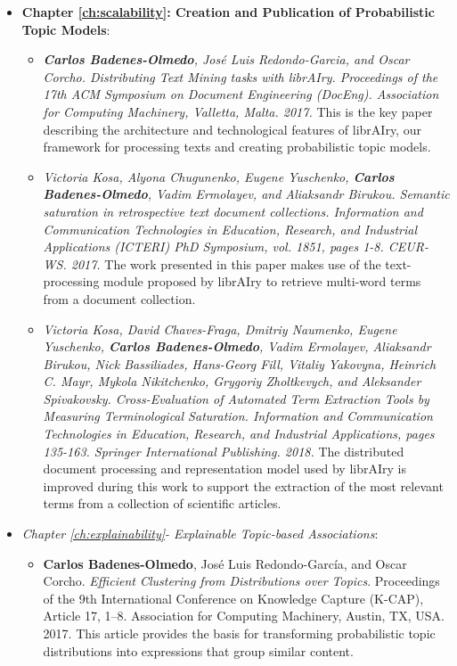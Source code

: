 \begin{itemize}
\item \textbf{Chapter \ref{ch:scalability}: Creation and Publication of Probabilistic Topic Models}:
\begin{itemize}
\item \textit{\textbf{Carlos Badenes-Olmedo}, José Luis Redondo-Garcia, and Oscar Corcho. \textit{Distributing Text Mining tasks with librAIry}. Proceedings of the 17th ACM Symposium on Document Engineering (DocEng). Association for Computing Machinery, Valletta, Malta. 2017.} This is the key paper describing the architecture and technological features of librAIry, our framework for processing texts and creating probabilistic topic models. 
\item \textit{Victoria Kosa, Alyona Chugunenko, Eugene Yuschenko, \textbf{Carlos Badenes-Olmedo}, Vadim Ermolayev, and Aliaksandr Birukou. \textit{Semantic saturation in retrospective text document collections}. Information and Communication Technologies in Education, Research, and Industrial Applications (ICTERI) PhD Symposium, vol. 1851, pages 1-8. CEUR-WS. 2017.} The work presented in this paper makes use of the text-processing module proposed by librAIry to retrieve multi-word terms from a document collection.
\item \textit{Victoria Kosa, David Chaves-Fraga, Dmitriy Naumenko, Eugene Yuschenko, \textbf{Carlos Badenes-Olmedo}, Vadim Ermolayev, Aliaksandr Birukou, Nick Bassiliades, Hans-Georg Fill, Vitaliy Yakovyna, Heinrich C. Mayr, Mykola Nikitchenko, Grygoriy Zholtkevych, and Aleksander Spivakovsky. \textit{Cross-Evaluation of Automated Term Extraction Tools by Measuring Terminological Saturation}. Information and Communication Technologies in Education, Research, and Industrial Applications, pages 135-163. Springer International Publishing. 2018.} The distributed document processing and representation model used by librAIry is improved during this work to support the extraction of the most relevant terms from a collection of scientific articles.
\end{itemize}
\item \textit{Chapter \ref{ch:explainability}- Explainable Topic-based Associations}:
\begin{itemize}
\item \textbf{Carlos Badenes-Olmedo}, José Luis Redondo-García, and Oscar Corcho. \textit{Efficient Clustering from Distributions over Topics}. Proceedings of the 9th International Conference on Knowledge Capture (K-CAP), Article 17, 1–8. Association for Computing Machinery, Austin, TX, USA. 2017. This article provides the basis for transforming probabilistic topic distributions into expressions that group similar content. 

\end{itemize}
\end{itemize}
